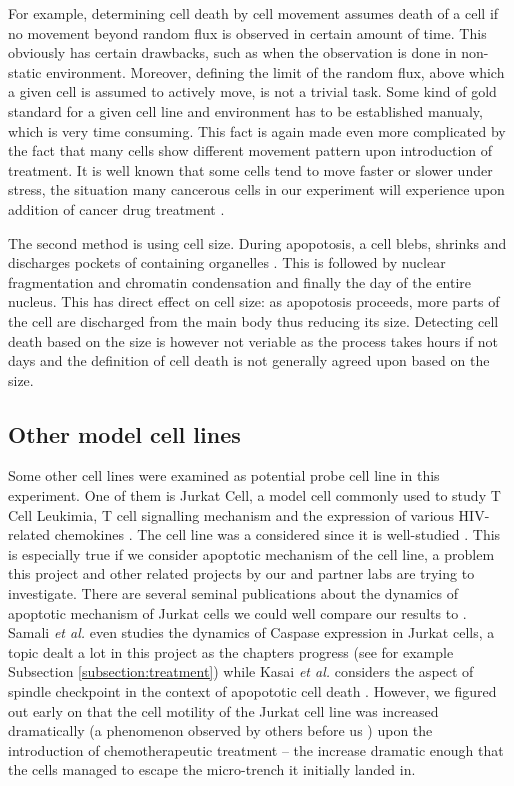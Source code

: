 \documentclass[pdftex,12pt,a4paper]{report}
\begin{document}
For example, determining cell death by cell movement assumes death of a cell if no movement beyond random flux is observed in certain amount of time. This obviously has certain drawbacks, such as when the observation is done in non-static environment. Moreover, defining the limit of the random flux, above which a given cell is assumed to actively move, is not a trivial task. Some kind of gold standard for a given cell line and environment has to be established manualy, which is very time consuming. This fact is again made even more complicated by the fact that many cells show different movement pattern upon introduction of treatment. It is well known that some cells tend to move faster or slower under stress, the situation many cancerous cells in our experiment will experience upon addition of cancer drug treatment \cite{pienta1991effects, fenteany2003small, ruocco2012suppressing}.

The second method is using cell size. During apopotosis, a cell blebs, shrinks and discharges pockets of containing organelles \cite{green2011means}. This is followed by nuclear fragmentation and chromatin condensation and finally the day of the entire nucleus. This has direct effect on cell size: as apopotosis proceeds, more parts of the cell are discharged from the main body thus reducing its size. Detecting cell death based on the size is however not veriable as the process takes hours if not days and the definition of cell death is not generally agreed upon based on the size.

\subsection{Other model cell lines}


Some other cell lines were examined as potential probe cell line in this experiment. One of them is Jurkat Cell, a model cell commonly used to study T Cell Leukimia, T cell signalling mechanism and the expression of various HIV-related chemokines \cite{schneider1977characterization}. The cell line was a considered since it is well-studied \cite{johnson2007genome, schena1996parallel}. This is especially true if we consider apoptotic mechanism of the cell line, a problem this project and other related projects by our  and partner labs are trying to investigate. There are several seminal publications about the dynamics of apoptotic mechanism of Jurkat cells we could well compare our results to \cite{gottlieb1996apoptosis}. Samali \textit{et al.} \cite{samali1999presence} even studies the dynamics of Caspase expression in Jurkat cells, a topic dealt a lot in this project as the chapters progress (see for example Subsection \ref{subsection:treatment}) while Kasai \textit{et al.} considers the aspect of spindle checkpoint in the context of apopototic cell death \cite{kasai2002prevalent}. However, we figured out early on that the cell motility of the Jurkat cell line was increased dramatically (a phenomenon observed by others before us \cite{barnhart2004cd95}) upon the introduction of chemotherapeutic treatment -- the increase dramatic enough that the cells managed to escape the micro-trench it initially landed in.
\end{document}
